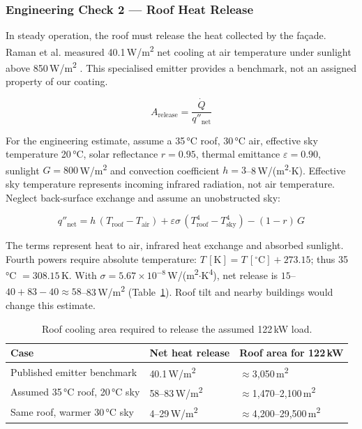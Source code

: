 \subsubsection{Engineering Check 2 --- Roof Heat Release}
\label{sec:check2}

In steady operation, the roof must release the heat collected by the façade. Raman et
al. measured 40.1\,W/m\textsuperscript{2} net cooling at air
temperature under sunlight above 850\,W/m\textsuperscript{2} \cite{raman2014}. This specialised emitter
provides a benchmark, not an assigned property of our coating.

\begin{equation}
A_{\text{release}} = \frac{\dot Q}{q''_{\text{net}}}
\end{equation}

For the engineering estimate, assume a 35\,°C roof, 30\,°C air, effective sky temperature
20\,°C, solar reflectance $r = 0.95$, thermal emittance $\varepsilon = 0.90$, sunlight
$G = 800$\,W/m\textsuperscript{2} and convection coefficient $h = 3$--8\,W/(m\textsuperscript{2}$\cdot$K).
Effective sky temperature represents incoming infrared radiation, not air temperature.
Neglect back-surface exchange and assume an unobstructed sky:

\begin{equation}
q''_{\text{net}} = h\,(T_{\text{roof}} - T_{\text{air}})
 + \varepsilon\sigma\,(T_{\text{roof}}^4 - T_{\text{sky}}^4) - (1 - r)\,G
\end{equation}

The terms represent heat to air, infrared heat exchange and absorbed sunlight. Fourth
powers require absolute temperature: $T\,[\text{K}] = T\,[^\circ\text{C}] + 273.15$; thus
35\,°C $= 308.15$\,K. With $\sigma = 5.67 \times 10^{-8}$\,W/(m\textsuperscript{2}$\cdot$K\textsuperscript{4}),
net release is $15$--$40 + 83 - 40 \approx 58$--83\,W/m\textsuperscript{2}
(Table~\ref{tab:roofarea}). Roof tilt and nearby buildings would change this estimate.

\begin{table}[H]
\centering\small
\caption{Roof cooling area required to release the assumed 122\,kW load.}
\label{tab:roofarea}
\renewcommand{\arraystretch}{1.2}
\begin{tabular}{l l l}
\toprule
\textbf{Case} & \textbf{Net heat release} & \textbf{Roof area for 122\,kW} \\
\midrule
Published emitter benchmark & 40.1\,W/m\textsuperscript{2} & $\approx$3,050\,m\textsuperscript{2} \\
Assumed 35\,°C roof, 20\,°C sky & 58--83\,W/m\textsuperscript{2} & $\approx$1,470--2,100\,m\textsuperscript{2} \\
Same roof, warmer 30\,°C sky & 4--29\,W/m\textsuperscript{2} & $\approx$4,200--29,500\,m\textsuperscript{2} \\
\bottomrule
\end{tabular}
\end{table}

